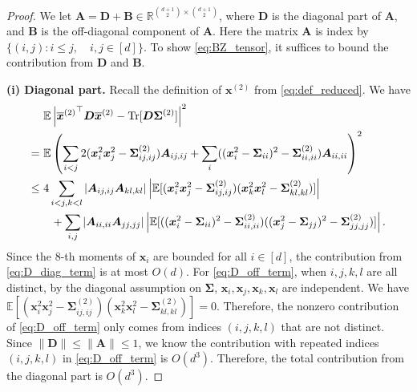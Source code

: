 \documentclass[twoside,11pt]{article}
\newcommand{\E}{\mathbb{E}}
\def\bA{{\boldsymbol A}}
\def\bB{{\boldsymbol B}}
\def\bD{{\boldsymbol D}}
\def\bx{{\boldsymbol x}}
\def\bSigma{{\boldsymbol \Sigma}}
\newcommand{\Tr}{\operatorname{Tr}}
\newcommand{\1}{\mathbf{1}}
\begin{document}
\begin{proof}
     We let $\bA=\bD+\bB \in \mathbb R^{\binom{d+1}{2}\times \binom{d+1}{2}}$, where $\bD$ is the diagonal part of $\bA$, and $\bB$ is the off-diagonal component of $\bA$.  Here the matrix $\bA$ is index by $\{(i,j): i\leq j, \quad i,j\in [d] \}$.
      To show \eqref{eq:BZ_tensor}, it suffices to bound the contribution from $\bD$ and $\bB$.



\textbf{ (i) Diagonal part.} Recall the definition of $\bx^{(2)}$ from \eqref{eq:def_reduced}. We have
\begin{align}
    &\E\left| {\overline\bx^{(2)}}^\top \bD\overline\bx^{(2)}-\Tr[\bD\bSigma^{(2)}]\right|^2\\
    =~&\E \left( \sum_{i<j}2(\bx_i^2 \bx_j^2-\bSigma_{ij,ij}^{(2)})\bA_{ij,ij} +\sum_{i} ((\bx_i^2-\bSigma_{ii})^2-\bSigma_{ii,ii}^{(2)}) \bA_{ii,ii}\right)^2 \notag \\
     \leq~& 4\sum_{i<j,k< l}|\bA_{ij,ij}\bA_{kl,kl}|\left|\E[ (\bx_{i}
    ^2\bx_j^2-\bSigma_{ij,ij}^{(2)})(\bx_{k}^2\bx_{l}^2-\bSigma_{kl,kl}^{(2)})]\right|\label{eq:D_off_term}\\
     &~~+\sum_{i,j} |\bA_{ii,ii}\bA_{jj,jj}| \left|\E[((\bx_i^2-\bSigma_{ii})^2-\bSigma_{ii,ii}^{(2)})((\bx_j^2-\bSigma_{jj})^2-\bSigma_{jj,jj}^{(2)})]\right|. \label{eq:D_diag_term}
\end{align}
    Since the $8$-th moments of $\bx_i$ are bounded for all $i\in [d]$, the contribution from \eqref{eq:D_diag_term} is at most $O(d)$. For \eqref{eq:D_off_term}, when $i,j,k,l$ are all distinct, by the diagonal assumption on $\bSigma$, $\bx_i,\bx_j,\bx_k,\bx_l$ are independent. We have
    $\E[ (\bx_{i}
    ^2\bx_j^2-\bSigma_{ij,ij}^{(2)})(\bx_{k}^2\bx_{l}^2-\bSigma_{kl,kl}^{(2)})]=0$.
Therefore, the nonzero contribution of \eqref{eq:D_off_term} only comes from indices $(i,j,k,l)$ that are not distinct. Since $\|\bD\|\leq \|\bA\|\leq 1$, we know the contribution with repeated indices  $(i,j,k,l)$ in \eqref{eq:D_off_term} is $O(d^3)$. Therefore, the total contribution from the diagonal part is $O(d^3)$.



\end{proof}
\end{document}
